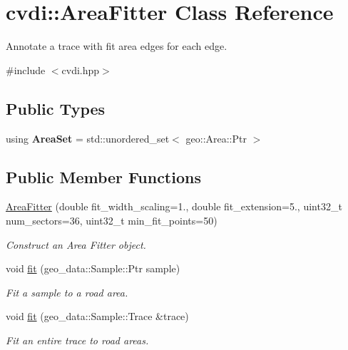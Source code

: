 \hypertarget{classcvdi_1_1AreaFitter}{}\section{cvdi\+:\+:Area\+Fitter Class Reference}
\label{classcvdi_1_1AreaFitter}


Annotate a trace with fit area edges for each edge.  




{\ttfamily \#include $<$cvdi.\+hpp$>$}

\subsection*{Public Types}
\begin{DoxyCompactItemize}
\item 
using {\bfseries Area\+Set} = std\+::unordered\+\_\+set$<$ geo\+::\+Area\+::\+Ptr $>$\hypertarget{classcvdi_1_1AreaFitter_ae7be357d8b6c0156cb8bfedecd5feb0f}{}\label{classcvdi_1_1AreaFitter_ae7be357d8b6c0156cb8bfedecd5feb0f}

\end{DoxyCompactItemize}
\subsection*{Public Member Functions}
\begin{DoxyCompactItemize}
\item 
\hyperlink{classcvdi_1_1AreaFitter_a53040e056cbdc8b8862ad03b36158eed}{Area\+Fitter} (double fit\+\_\+width\+\_\+scaling=1., double fit\+\_\+extension=5., uint32\+\_\+t num\+\_\+sectors=36, uint32\+\_\+t min\+\_\+fit\+\_\+points=50)
\begin{DoxyCompactList}\small\item\em Construct an Area Fitter object. \end{DoxyCompactList}\item 
void \hyperlink{classcvdi_1_1AreaFitter_a8f4d6d9a5e4e27afbe9ea74cd52e5351}{fit} (geo\+\_\+data\+::\+Sample\+::\+Ptr sample)
\begin{DoxyCompactList}\small\item\em Fit a sample to a road area. \end{DoxyCompactList}\item 
void \hyperlink{classcvdi_1_1AreaFitter_a87669e87838bc1a3181e7b905c1967fa}{fit} (geo\+\_\+data\+::\+Sample\+::\+Trace \&trace)
\begin{DoxyCompactList}\small\item\em Fit an entire trace to road areas. \end{DoxyCompactList}\end{DoxyCompactItemize}
